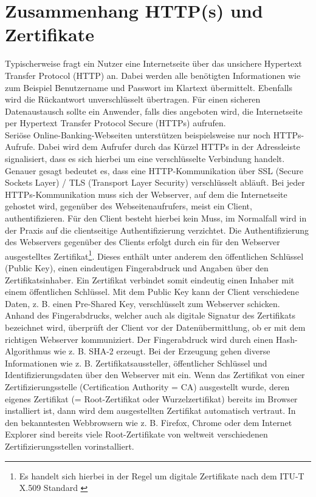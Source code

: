 \section{Zusammenhang HTTP(s) und Zertifikate}
\label{sec:HTTPs}
Typischerweise fragt ein Nutzer eine Internetseite über das unsichere Hypertext Transfer Protocol (HTTP) an. Dabei werden alle benötigten Informationen wie zum Beispiel Benutzername und Passwort im Klartext übermittelt. Ebenfalls wird die Rückantwort unverschlüsselt übertragen. Für einen sicheren Datenaustausch sollte ein Anwender, falls dies angeboten wird, die Internetseite per Hypertext Transfer Protocol Secure (HTTPs) aufrufen. \cite[vgl.]{RFC7230} 
\\Seriöse Online-Banking-Webseiten unterstützen beispielsweise nur noch HTTPs-Aufrufe. Dabei wird dem Aufrufer durch das Kürzel HTTPs in der Adressleiste signalisiert, dass es sich hierbei um eine verschlüsselte Verbindung handelt. Genauer gesagt bedeutet es, dass eine HTTP-Kommunikation über SSL (Secure Sockets Layer) / TLS (Transport Layer Security) verschlüsselt abläuft. Bei jeder HTTPs-Kommunikation muss sich der Webserver, auf dem die Internetseite gehostet wird, gegenüber des Webseitenaufrufers, meist ein Client, authentifizieren. Für den Client besteht hierbei kein Muss, im Normalfall wird in der Praxis auf die clientseitige Authentifizierung verzichtet. Die Authentifizierung des Webservers gegenüber des Clients erfolgt durch ein für den Webserver ausgestelltes Zertifikat\footnote{Es handelt sich hierbei in der Regel um digitale Zertifikate nach dem ITU-T X.509 Standard \cite[vgl.]{RFC6101}}. \cite[vgl.]{RFC2818} 
Dieses enthält unter anderem den öffentlichen Schlüssel (Public Key), einen eindeutigen Fingerabdruck und Angaben über den Zertifikatsinhaber. \cite[vgl.]{x.509} Ein Zertifikat verbindet somit eindeutig einen Inhaber mit einem öffentlichen Schlüssel. Mit dem Public Key kann der Client verschiedene Daten, z. B. einen Pre-Shared Key, verschlüsselt zum Webserver schicken. Anhand des Fingerabdrucks, welcher auch als digitale Signatur des Zertifikats bezeichnet wird, überprüft der Client vor der Datenübermittlung, ob er mit dem richtigen Webserver kommuniziert. Der Fingerabdruck wird durch einen Hash-Algorithmus wie z. B. SHA-2 erzeugt. Bei der Erzeugung gehen diverse Informationen wie z. B. Zertifikatsaussteller, öffentlicher Schlüssel und Identifizierungsdaten über den Webserver mit ein. 
Wenn das Zertifikat von einer Zertifizierungsstelle (Certification Authority = CA) ausgestellt wurde, deren eigenes Zertifikat (= Root-Zertifikat oder Wurzelzertifikat) bereits im Browser installiert ist, dann wird dem ausgestellten Zertifikat automatisch vertraut. In den bekanntesten Webbrowsern wie z. B. Firefox, Chrome oder dem Internet Explorer sind bereits viele Root-Zertifikate von weltweit verschiedenen Zertifizierungsstellen vorinstalliert.
